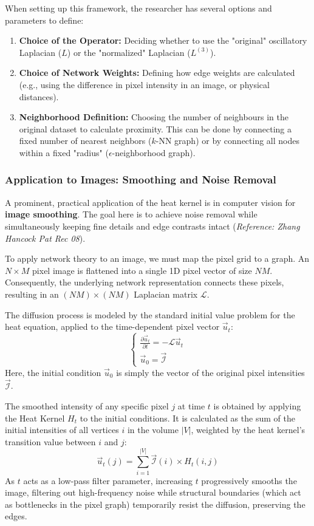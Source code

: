 When setting up this framework, the researcher has several options and parameters to define:
\begin{enumerate}
    \item \textbf{Choice of the Operator:} Deciding whether to use the "original" oscillatory Laplacian (\( L \)) or the "normalized" Laplacian (\( L^{(3)} \)).
    \item \textbf{Choice of Network Weights:} Defining how edge weights are calculated (e.g., using the difference in pixel intensity in an image, or physical distances).
    \item \textbf{Neighborhood Definition:} Choosing the number of neighbours in the original dataset to calculate proximity. This can be done by connecting a fixed number of nearest neighbors (\( k \)-NN graph) or by connecting all nodes within a fixed "radius" (\( \epsilon \)-neighborhood graph).
\end{enumerate}

\subsubsection{Application to Images: Smoothing and Noise Removal}
A prominent, practical application of the heat kernel is in computer vision for \textbf{image smoothing}. The goal here is to achieve noise removal while simultaneously keeping fine details and edge contrasts intact (\textit{Reference: Zhang Hancock Pat Rec 08}).

To apply network theory to an image, we must map the pixel grid to a graph. An \( N \times M \) pixel image is flattened into a single 1D pixel vector of size \( NM \). Consequently, the underlying network representation connects these pixels, resulting in an \( (NM) \times (NM) \) Laplacian matrix \( \mathcal{L} \).

The diffusion process is modeled by the standard initial value problem for the heat equation, applied to the time-dependent pixel vector \( \vec{u}_t \):
\[
    \begin{cases}
        \frac{\partial \vec{u}_t}{\partial t} = -\mathcal{L} \vec{u}_t \\
        \vec{u}_0 = \vec{\mathcal{I}}
    \end{cases}
\]
Here, the initial condition \( \vec{u}_0 \) is simply the vector of the original pixel intensities \( \vec{\mathcal{I}} \).

The smoothed intensity of any specific pixel \( j \) at time \( t \) is obtained by applying the Heat Kernel \( H_t \) to the initial conditions. It is calculated as the sum of the initial intensities of all vertices \( i \) in the volume \( |V| \), weighted by the heat kernel's transition value between \( i \) and \( j \):
\[
    \vec{u}_t(j) = \sum_{i=1}^{|V|} \vec{\mathcal{I}}(i) \times H_t(i,j)
\]
As \( t \) acts as a low-pass filter parameter, increasing \( t \) progressively smooths the image, filtering out high-frequency noise while structural boundaries (which act as bottlenecks in the pixel graph) temporarily resist the diffusion, preserving the edges.


